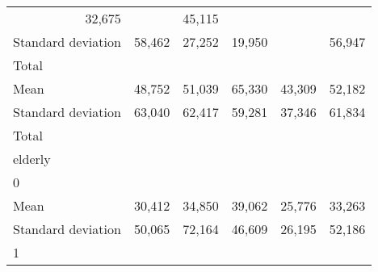 \begin{tabular}{llllll}
  \multicolumn{1}{r}{32,675} &
  \multicolumn{1}{r}{} &
  \multicolumn{1}{r}{45,115} \\
\multicolumn{1}{l}{\hspace{4em}Standard deviation} &
  \multicolumn{1}{|r}{58,462} &
  \multicolumn{1}{r}{27,252} &
  \multicolumn{1}{r}{19,950} &
  \multicolumn{1}{r}{} &
  \multicolumn{1}{r}{56,947} \\
\multicolumn{1}{l}{\hspace{3em}Total} &
  \multicolumn{1}{|r}{} &
  \multicolumn{1}{r}{} &
  \multicolumn{1}{r}{} &
  \multicolumn{1}{r}{} &
  \multicolumn{1}{r}{} \\
\multicolumn{1}{l}{\hspace{4em}Mean} &
  \multicolumn{1}{|r}{48,752} &
  \multicolumn{1}{r}{51,039} &
  \multicolumn{1}{r}{65,330} &
  \multicolumn{1}{r}{43,309} &
  \multicolumn{1}{r}{52,182} \\
\multicolumn{1}{l}{\hspace{4em}Standard deviation} &
  \multicolumn{1}{|r}{63,040} &
  \multicolumn{1}{r}{62,417} &
  \multicolumn{1}{r}{59,281} &
  \multicolumn{1}{r}{37,346} &
  \multicolumn{1}{r}{61,834} \\
\multicolumn{1}{l}{\hspace{1em}Total} &
  \multicolumn{1}{|r}{} &
  \multicolumn{1}{r}{} &
  \multicolumn{1}{r}{} &
  \multicolumn{1}{r}{} &
  \multicolumn{1}{r}{} \\
\multicolumn{1}{l}{\hspace{2em}elderly} &
  \multicolumn{1}{|r}{} &
  \multicolumn{1}{r}{} &
  \multicolumn{1}{r}{} &
  \multicolumn{1}{r}{} &
  \multicolumn{1}{r}{} \\
\multicolumn{1}{l}{\hspace{3em}0} &
  \multicolumn{1}{|r}{} &
  \multicolumn{1}{r}{} &
  \multicolumn{1}{r}{} &
  \multicolumn{1}{r}{} &
  \multicolumn{1}{r}{} \\
\multicolumn{1}{l}{\hspace{4em}Mean} &
  \multicolumn{1}{|r}{30,412} &
  \multicolumn{1}{r}{34,850} &
  \multicolumn{1}{r}{39,062} &
  \multicolumn{1}{r}{25,776} &
  \multicolumn{1}{r}{33,263} \\
\multicolumn{1}{l}{\hspace{4em}Standard deviation} &
  \multicolumn{1}{|r}{50,065} &
  \multicolumn{1}{r}{72,164} &
  \multicolumn{1}{r}{46,609} &
  \multicolumn{1}{r}{26,195} &
  \multicolumn{1}{r}{52,186} \\
\multicolumn{1}{l}{\hspace{3em}1} &

\end{tabular}
